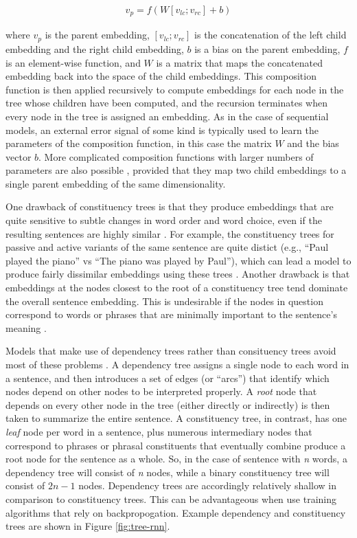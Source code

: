 \begin{align} 
\label{eqn:ct_rnn}
v_p = f (W [v_{lc}; v_{rc}] + b)
\end{align}

\noindent
where $v_p$ is the parent embedding, $[v_{lc}; v_{rc}]$ is the concatenation of the left child embedding and the right child embedding, $b$ is a bias on the parent embedding, $f$ is an element-wise function, and $W$ is a matrix that maps the concatenated embedding back into the space of the child embeddings. This composition function is then applied recursively to compute embeddings for each node in the tree whose children have been computed, and the recursion terminates when every node in the tree is assigned an embedding. As in the case of sequential models, an external error signal of some kind is typically used to learn the parameters of the composition function, in this case the matrix $W$ and the bias vector $b$. More complicated composition functions with larger numbers of parameters are also possible \citep[e.g.,][]{Tai:2015,Socher:2012}, provided that they map two child embeddings to a single parent embedding of the same dimensionality. 

One drawback of constituency trees is that they produce embeddings that are quite sensitive to subtle changes in word order and word choice, even if the resulting sentences are highly similar \citep{Socher:2014,Iyyer:2014}. For example, the constituency trees for passive and active variants of the same sentence are quite distict (e.g., ``Paul played the piano'' vs ``The piano was played by Paul''), which can lead a model to produce fairly dissimilar embeddings using these trees \citep{Socher:2014}. Another drawback is that embeddings at the nodes closest to the root of a constituency tree tend dominate the overall sentence embedding. This is undesirable if the nodes in question correspond to words or phrases that are minimally important to the sentence's meaning \citep{Socher:2014}.

Models that make use of dependency trees rather than consituency trees avoid most of these problems \citep{Socher:2014}. A dependency tree assigns a single node to each word in a sentence, and then introduces a set of edges (or ``arcs'') that identify which nodes depend on other nodes to be interpreted properly. A \textit{root} node that depends on every other node in the tree (either directly or indirectly) is then taken to summarize the entire sentence. A constituency tree, in contrast, has one \textit{leaf} node per word in a sentence, plus numerous intermediary nodes that correspond to phrases or phrasal constituents that eventually combine produce a root node for the sentence as a whole. So, in the case of sentence with \textit{n} words, a dependency tree will consist of \textit{n} nodes, while a binary constituency tree will consist of $2n - 1$ nodes. Dependency trees are accordingly relatively shallow in comparison to constituency trees. This can be advantageous when use training algorithms that rely on backpropogation. Example dependency and constituency trees are shown in Figure \ref{fig:tree-rnn}. 

